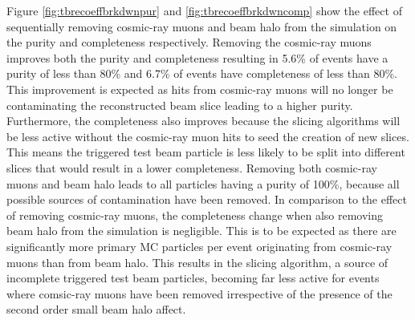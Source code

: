Figure \ref{fig:tbrecoeffbrkdwnpur} and \ref{fig:tbrecoeffbrkdwncomp} show the effect of sequentially removing cosmic-ray muons and beam halo from the simulation on the purity and completeness respectively.  Removing the cosmic-ray muons improves both the purity and completeness resulting in 5.6\% of events have a purity of less than 80\% and 6.7\% of events have completeness of less than 80\%.  This improvement is expected as hits from cosmic-ray muons will no longer be contaminating the reconstructed beam slice leading to a higher purity.  Furthermore, the completeness also improves because the slicing algorithms will be less active without the cosmic-ray muon hits to seed the creation of new slices.  This means the triggered test beam particle is less likely to be split into different slices that would result in a lower completeness.  Removing both cosmic-ray muons and beam halo leads to all particles having a purity of 100\%, because all possible sources of contamination have been removed.  In comparison to the effect of removing cosmic-ray muons, the completeness change when also removing beam halo from the simulation is negligible.  This is to be expected as there are significantly more primary MC particles per event originating from cosmic-ray muons than from beam halo.  This results in the slicing algorithm, a source of incomplete triggered test beam particles, becoming far less active for events where comsic-ray muons have been removed irrespective of the presence of the second order small beam halo affect.

